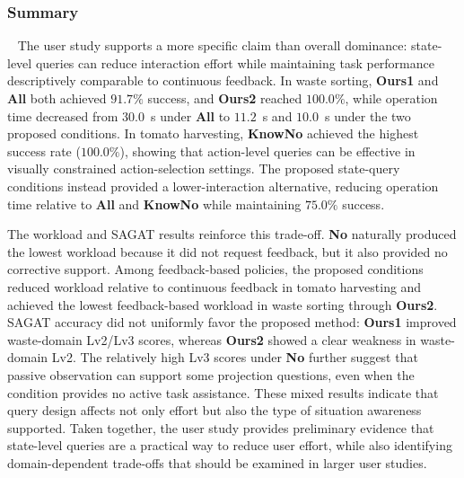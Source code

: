 \subsubsection{Summary}~\label{user:discussion}
The user study supports a more specific claim than overall dominance: state-level queries can reduce interaction effort while maintaining task performance descriptively comparable to continuous feedback. In waste sorting, \textbf{Ours1} and \textbf{All} both achieved $91.7\%$ success, and \textbf{Ours2} reached $100.0\%$, while operation time decreased from $30.0$~s under \textbf{All} to $11.2$~s and $10.0$~s under the two proposed conditions. In tomato harvesting, \textbf{KnowNo} achieved the highest success rate ($100.0\%$), showing that action-level queries can be effective in visually constrained action-selection settings. The proposed state-query conditions instead provided a lower-interaction alternative, reducing operation time relative to \textbf{All} and \textbf{KnowNo} while maintaining $75.0\%$ success.

The workload and SAGAT results reinforce this trade-off. \textbf{No} naturally produced the lowest workload because it did not request feedback, but it also provided no corrective support. Among feedback-based policies, the proposed conditions reduced workload relative to continuous feedback in tomato harvesting and achieved the lowest feedback-based workload in waste sorting through \textbf{Ours2}. SAGAT accuracy did not uniformly favor the proposed method: \textbf{Ours1} improved waste-domain Lv2/Lv3 scores, whereas \textbf{Ours2} showed a clear weakness in waste-domain Lv2. The relatively high Lv3 scores under \textbf{No} further suggest that passive observation can support some projection questions, even when the condition provides no active task assistance. These mixed results indicate that query design affects not only effort but also the type of situation awareness supported. Taken together, the user study provides preliminary evidence that state-level queries are a practical way to reduce user effort, while also identifying domain-dependent trade-offs that should be examined in larger user studies.
